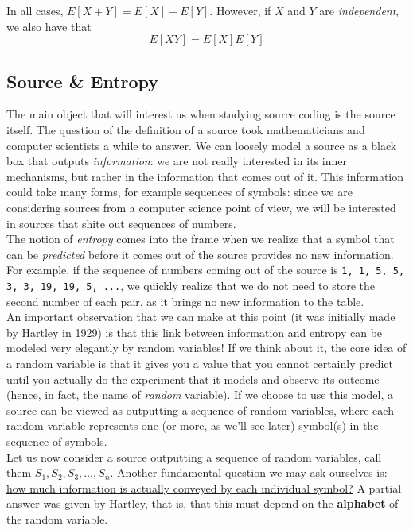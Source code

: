 \documentclass{report}
\begin{document}
\begin{thm} In all cases, $E[X+Y] = E[X] + E[Y]$. However, if $X$ and $Y$ are \emph{independent}, we also have that
\begin{equation}
	E[XY] = E[X]E[Y]
\end{equation}
\end{thm}

\subsection{Source \& Entropy}
The main object that will interest us when studying source coding is the source itself. The question of the definition of a source took mathematicians and computer scientists a while to answer. We can loosely model a source as a black box that outputs \emph{information}: we are not really interested in its inner mechanisms, but rather in the information that comes out of it. This information could take many forms, for example sequences of symbols: since we are considering sources from a computer science point of view, we will be interested in sources that shite out sequences of numbers. \\
 The notion of \emph{entropy} comes into the frame when we realize that a symbol that can be \emph{predicted} before it comes out of the source provides no new information. For example, if the sequence of numbers coming out of the source is \texttt{1, 1, 5, 5, 3, 3, 19, 19, 5, ...}, we quickly realize that we do not need to store the second number of each pair, as it brings no new information to the table. \\
 An important observation that we can make at this point (it was initially made by Hartley in 1929) is that this link between information and entropy can be modeled very elegantly by random variables! If we think about it, the core idea of a random variable is that it gives you a value that you cannot certainly predict until you actually do the experiment that it models and observe its outcome (hence, in fact, the name of \emph{random} variable). If we choose to use this model, a source can be viewed as outputting a sequence of random variables, where each random variable represents one (or more, as we'll see later) symbol(s) in the sequence of symbols. \\
Let us now consider a source outputting a sequence of random variables, call them $S_1, S_2, S_3, \dots, S_n$. Another fundamental question we may ask ourselves is: \ul{how much information is actually conveyed by each individual symbol?} A partial answer was given by Hartley, that is, that this must depend on the \textbf{alphabet} of the random variable.
\end{document}
